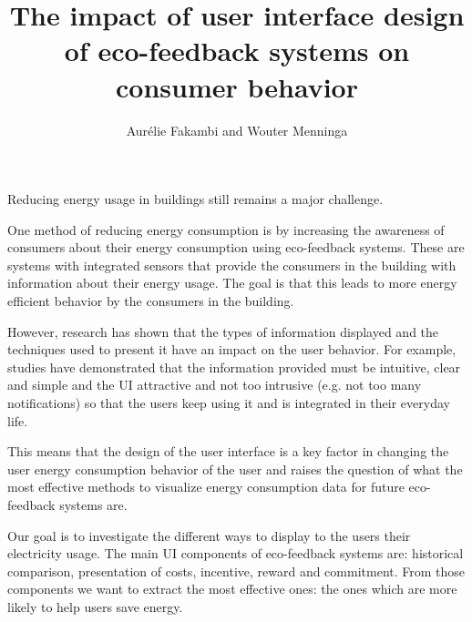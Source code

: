 \documentclass[journal]{vgtc}                %
\title{The impact of user interface design of eco-feedback systems on consumer behavior}
\author{Aur\'{e}lie Fakambi and Wouter Menninga}
\begin{document}


\maketitle


Reducing energy usage in buildings still remains a major challenge.

One method of reducing energy consumption is by increasing the awareness of consumers about their energy consumption using eco-feedback systems. These are systems with integrated sensors that provide the consumers in the building with information about their energy usage. The goal is that this leads to more energy efficient behavior by the consumers in the building. 

However, research has shown that the types of information displayed and the techniques used to present it have an impact on the user behavior.
For example, studies have demonstrated that the information provided must be intuitive, clear and simple and the UI attractive and not too intrusive (e.g. not too many notifications) so that the users keep using it and is integrated in their everyday life\cite{spagnolli2011eco}.

This means that the design of the user interface is a key factor in changing the user energy consumption behavior of the user and raises the question of what the most effective methods to visualize energy consumption data for future eco-feedback systems are. 

Our goal is to investigate the different ways to display to the users their electricity usage.
The main UI components of eco-feedback systems are: historical comparison, presentation of costs, incentive, reward and commitment. From those components we want to extract the most effective ones: the ones which are more likely to help users save energy. 
\end{document}
